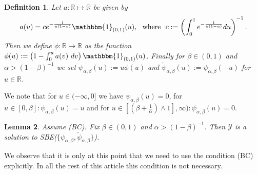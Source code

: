 \documentclass[a4paper, reqno, 12pt]{amsart}
\theoremstyle{plain}
\newtheorem{definition}{Definition}[section]
\newtheorem{lemma}[definition]{Lemma}
\theoremstyle{definition}
\newcommand{\R}{\mathbb{R}}
\newcommand{\leander}[1]{\textcolor{red}{(L: #1)}}
\begin{document}
\begin{definition} \label{def:psialphabeta}
    Let $a:\R\mapsto\R$ be given by 
    \begin{align*}
        a(u) = ce^{-\frac{1}{u(1-u)}}\mathbbm{1}_{(0,1)}(u), \ \text{ where } \ c := \left( \int_0^1e^{-\frac{1}{u(1-u)}} du\right)^{-1}.
    \end{align*}
    Then we define $\phi:\R\mapsto\R$ as the function $\phi(u) := \left(1-\int_0^u a(v)\ dv\right) \mathbbm{1}_{(0,1)}(u)$.
    Finally for $\beta \in (0,1)$ and $\alpha>(1-\beta)^{-1}$ we set $\psi_{\alpha,\beta}(u) := u\phi(u)$ and $\check\psi_{\alpha,\beta}(u):= \psi_{\alpha,\beta}(-u)$ for $u\in\R$. 
\end{definition}

We note that for $u\in (-\infty,0]$ we have $\psi_{\alpha,\beta}(u) = 0$, for $u\in[0,\beta]:\psi_{\alpha,\beta}(u) = u$ and for $u\in[(\beta + \frac{1}{\alpha})\wedge 1],\infty): \psi_{\alpha,\beta}(u) = 0$.


\begin{lemma}\label{lem:psiextension}
    Assume (BC). Fix $\beta\in(0,1)$ and $\alpha >(1-\beta)^{-1}$. Then $\mathcal Y$ is a solution to SBE($\{\psi_{\alpha,\beta},\check\psi_{\alpha,\beta}\}$).
\end{lemma}

We observe that it is only at this point that we need to use the condition (BC) explicitly. In all the rest of this article this condition is  not necessary.
\end{document}
